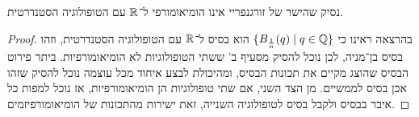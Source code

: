 \subquestion{}
נסיק שהישר של זורגנפריי אינו הומיאומורפי ל־$\mathbb{R}$ עם הטופולוגיה הסטנדרטית.
\begin{proof}
	בהרצאה ראינו כי $\{ B_\frac{1}{n}(q) \mid q \in \mathbb{Q} \}$ הוא בסיס ל־$\mathbb{R}$ עם הטופולוגיה הסטנדרטית, וזהו בסיס בן־מניה, לכן נוכל להסיק מסעיף ב' ששתי הטופולוגיות לא הומיאומורפיות.
	ביתר פירוט הבסיס שהוצג מקיים את תכונות הבסיס, ומהיכולת לבצע איחוד מכל עוצמה נוכל להסיק שזהו אכן בסיס לממשיים.
	מן הצד השני, אם שתי טופולוגיות הן הומיאומורפיות, אז נוכל למפות כל איבר בבסיס ולקבל בסיס לטופולוגיה השנייה, זאת ישירות מהתכונות של הומיאומורפיזמים.
\end{proof}


